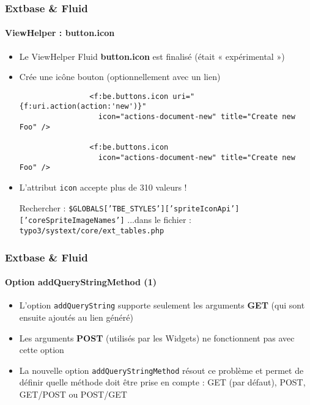 \begin{frame}[fragile]
	\frametitle{Extbase \& Fluid}
	\framesubtitle{ViewHelper : button.icon}

	\lstset{
		basicstyle=\smaller\ttfamily
	}

	\begin{itemize}
		\item Le ViewHelper Fluid \textbf{button.icon} est finalisé (était « expérimental »)
		\item Crée une icône bouton (optionnellement avec un lien)

			\begin{lstlisting}
				<f:be.buttons.icon uri="{f:uri.action(action:'new')}"
				  icon="actions-document-new" title="Create new Foo" />

				<f:be.buttons.icon
				  icon="actions-document-new" title="Create new Foo" />
			\end{lstlisting}

		\item L'attribut \texttt{icon} accepte plus de 310 valeurs !\newline

			\smaller
				Rechercher :\newline
				\texttt{\$GLOBALS['TBE\_STYLES']['spriteIconApi']['coreSpriteImageNames']}\newline
				...dans le fichier :\newline
				\texttt{typo3/systext/core/ext\_tables.php}
			\normalsize

	\end{itemize}

\end{frame}


\begin{frame}[fragile]
	\frametitle{Extbase \& Fluid}
	\framesubtitle{Option addQueryStringMethod (1)}

	\begin{itemize}
		\item L'option \texttt{addQueryString} supporte seulement les arguments \textbf{GET}\newline
			(qui sont ensuite ajoutés au lien généré)
		\item Les arguments \textbf{POST} (utilisés par les Widgets) ne fonctionnent pas avec cette option
		\item La nouvelle option \texttt{addQueryStringMethod} résout ce problème et permet de définir quelle méthode doit être prise en compte :\newline
			GET (par défaut), POST, GET/POST ou POST/GET

	\end{itemize}

\end{frame}

